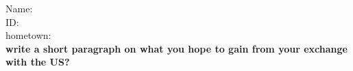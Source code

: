 \documentclass[11pt]{article}
\begin{document}

\vspace{0.5cm}

Name: \underline{\hspace{2.8in}} \\
ID:\underline{\hspace{2.8in}}\\
hometown:\underline{\hspace{2.8in}}\\
\textbf{write a short paragraph on what you hope to gain from your exchange with the US?}
\end{document}
